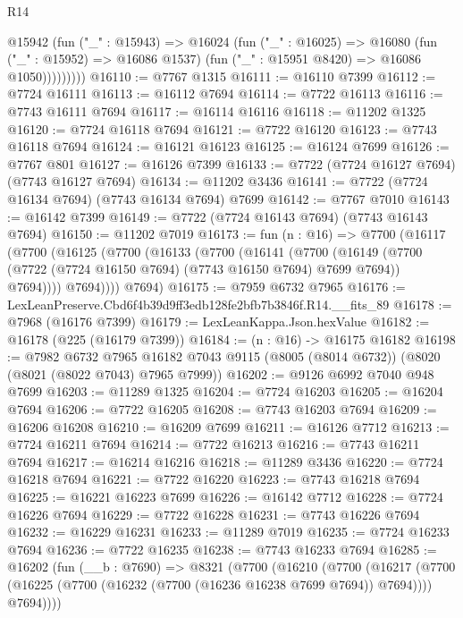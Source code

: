 \begin{lexlean}{R14}
\begin{coremodule}
              @15942
                (fun ("_" : @15943) =>
                @16024
                  (fun ("_" : @16025) =>
                  @16080
                    (fun ("_" : @15952) => @16086 @1537)
                    (fun ("_" : @15951 @8420) => @16086 @1050)))))))))
@16110 := @7767 @1315
@16111 := @16110 @7399
@16112 := @7724 @16111
@16113 := @16112 @7694
@16114 := @7722 @16113
@16116 := @7743 @16111 @7694
@16117 := @16114 @16116
@16118 := @11202 @1325
@16120 := @7724 @16118 @7694
@16121 := @7722 @16120
@16123 := @7743 @16118 @7694
@16124 := @16121 @16123
@16125 := @16124 @7699
@16126 := @7767 @801
@16127 := @16126 @7399
@16133 := @7722 (@7724 @16127 @7694) (@7743 @16127 @7694)
@16134 := @11202 @3436
@16141 := @7722 (@7724 @16134 @7694) (@7743 @16134 @7694) @7699
@16142 := @7767 @7010
@16143 := @16142 @7399
@16149 := @7722 (@7724 @16143 @7694) (@7743 @16143 @7694)
@16150 := @11202 @7019
@16173 := fun (n : @16) =>
  @7700
    (@16117
      (@7700
        (@16125
          (@7700
            (@16133
              (@7700
                (@16141
                  (@7700
                    (@16149
                      (@7700 (@7722 (@7724 @16150 @7694) (@7743 @16150 @7694) @7699 @7694))
                      @7694))))
              @7694))))
      @7694)
@16175 := @7959 @6732 @7965
@16176 := LexLeanPreserve.Cbd6f4b39d9ff3edb128fe2bfb7b3846f.R14.__fits_89
@16178 := @7968 (@16176 @7399)
@16179 := LexLeanKappa.Json.hexValue
@16182 := @16178 (@225 (@16179 @7399))
@16184 := (n : @16) -> @16175 @16182
@16198 := @7982
    @6732
    @7965
    @16182
    @7043
    @9115
    (@8005 (@8014 @6732))
    (@8020 (@8021 (@8022 @7043) @7965 @7999))
@16202 := @9126 @6992 @7040 @948 @7699
@16203 := @11289 @1325
@16204 := @7724 @16203
@16205 := @16204 @7694
@16206 := @7722 @16205
@16208 := @7743 @16203 @7694
@16209 := @16206 @16208
@16210 := @16209 @7699
@16211 := @16126 @7712
@16213 := @7724 @16211 @7694
@16214 := @7722 @16213
@16216 := @7743 @16211 @7694
@16217 := @16214 @16216
@16218 := @11289 @3436
@16220 := @7724 @16218 @7694
@16221 := @7722 @16220
@16223 := @7743 @16218 @7694
@16225 := @16221 @16223 @7699
@16226 := @16142 @7712
@16228 := @7724 @16226 @7694
@16229 := @7722 @16228
@16231 := @7743 @16226 @7694
@16232 := @16229 @16231
@16233 := @11289 @7019
@16235 := @7724 @16233 @7694
@16236 := @7722 @16235
@16238 := @7743 @16233 @7694
@16285 := @16202
    (fun (__b : @7690) =>
    @8321
      (@7700
        (@16210
          (@7700
            (@16217
              (@7700 (@16225 (@7700 (@16232 (@7700 (@16236 @16238 @7699 @7694)) @7694))))
              @7694))))

\end{coremodule}
\end{lexlean}

